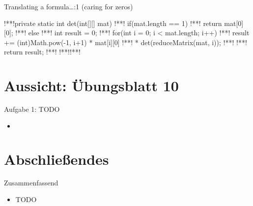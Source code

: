 \begin{frame}[fragile,c]{Translating a formula\ldots{}:1 (caring for zeros)}
\begin{plainjava}
!**!private static int det(int[][] mat) {
!**!    if(mat.length == 1) {
!**!        return mat[0][0];
!**!    } else {
!**!        int result = 0;
!**!        for(int i = 0; i < mat.length; i++) {
!**!            result += (int)Math.pow(-1, i+1) * mat[i][0]
!**!                        * det(reduceMatrix(mat, i));
!**!        }
!**!        return result;
!**!    }
!**!}!**!
\end{plainjava}
\end{frame}


\iffull
{}
\section{Aussicht: Übungsblatt 10}

\begin{frame}{Aufgabe 1: TODO}
\begin{itemize}[<+(1)->]
    \item
\end{itemize}
\end{frame}
\fi


\section{Abschließendes}
{\SummaryFrame
\begin{frame}[t]{Zusammenfassend}
\pause \printBibCommand
\vfill\vfill %
\begin{itemize}[<+(1)->]
    \itemsep8pt
    \item TODO
\end{itemize}
\end{frame}
}


\iffull\fi
